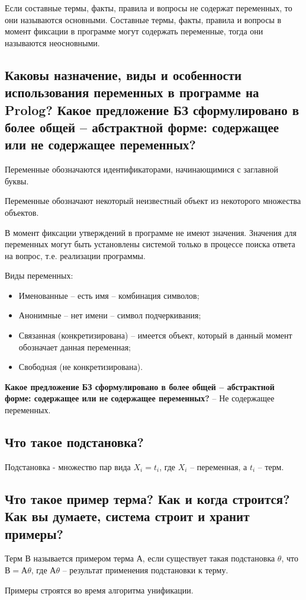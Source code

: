 \documentclass[12pt,a4paper]{article}
\begin{document}
Если составные термы, факты, правила и вопросы не содержат переменных, то они называются основными. 
Составные термы, факты, правила и вопросы в момент фиксации в программе могут содержать переменные, тогда они называются неосновными.

\subsection{Каковы назначение, виды и особенности использования переменных в программе на Prolog? Какое предложение БЗ сформулировано в более общей
-- абстрактной форме: содержащее или не содержащее переменных?}

Переменные обозначаются идентификаторами, начинающимися с заглавной буквы. 

Переменные обозначают некоторый неизвестный объект из некоторого множества объектов. 

В момент фиксации утверждений в программе не имеют значения. Значения для переменных могут быть установлены системой только в процессе поиска ответа на вопрос, т.е. реализации программы.

Виды переменных:
\begin{itemize}
	\item Именованные – есть имя – комбинация символов;
	\item Анонимные – нет имени – символ подчеркивания;
	\item Связанная (конкретизирована) – имеется объект, который в данный момент обозначает данная переменная;
	\item Свободная (не конкретизирована).
\end{itemize}

\textbf{Какое предложение БЗ сформулировано в более общей – абстрактной форме: содержащее или не содержащее переменных?} -- Не содержащее переменных.


\subsection{Что такое подстановка?}
Подстановка - множество пар вида ${X_i = t_i}$, где $X_i$ – переменная, а $t_i$ – терм.

\subsection{Что такое пример терма? Как и когда строится? Как вы думаете, система строит и хранит примеры?}
Терм В называется примером терма А, если существует такая подстановка $\theta$, что $В=А\theta$, где $А\theta$ – результат применения подстановки к терму.

Примеры строятся во время алгоритма унификации. 
\end{document}
